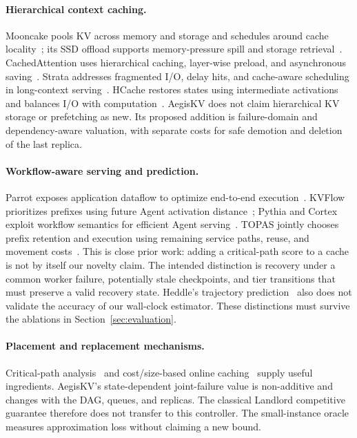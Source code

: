 \documentclass[sigplan,10pt,anonymous,nonacm]{acmart}
\begin{document}
\paragraph{Hierarchical context caching.}
Mooncake pools KV across memory and storage and schedules around cache
locality~\cite{qin2025mooncake}; its SSD offload supports memory-pressure
spill and storage retrieval~\cite{mooncake2026ssdoffload}. CachedAttention
uses hierarchical caching, layer-wise preload, and asynchronous
saving~\cite{gao2024cachedattention}. Strata addresses fragmented I/O,
delay hits, and cache-aware scheduling in long-context
serving~\cite{xie2026strata}. HCache restores states using intermediate
activations and balances I/O with computation~\cite{gao2025hcache}.
AegisKV does not claim hierarchical KV storage or prefetching as new.
Its proposed addition is failure-domain and dependency-aware valuation,
with separate costs for safe demotion and deletion of the last replica.

\paragraph{Workflow-aware serving and prediction.}
Parrot exposes application dataflow to optimize end-to-end
execution~\cite{lin2024parrot}. KVFlow prioritizes prefixes using future
Agent activation distance~\cite{pan2025kvflow}; Pythia and Cortex exploit
workflow semantics for efficient Agent serving~\cite{yu2026pythia,pagonas2025cortex}.
TOPAS jointly chooses prefix retention and execution using remaining
service paths, reuse, and movement costs~\cite{ni2026topas}. This is close
prior work: adding a critical-path score to a cache is not by itself our
novelty claim. The intended distinction is recovery under a common worker
failure, potentially stale checkpoints, and tier transitions that must
preserve a valid recovery state. Heddle's trajectory
prediction~\cite{zhang2026heddle} also does not validate the accuracy of our
wall-clock estimator. These distinctions must survive the ablations in
Section~\ref{sec:evaluation}.

\paragraph{Placement and replacement mechanisms.}
Critical-path analysis~\cite{kelley1959cpm} and cost/size-based online
caching~\cite{young2002landlord} supply useful ingredients. AegisKV's
state-dependent joint-failure value is non-additive and changes with the
DAG, queues, and replicas. The classical Landlord competitive guarantee
therefore does not transfer to this controller. The small-instance oracle
measures approximation loss without claiming a new bound.
\end{document}
